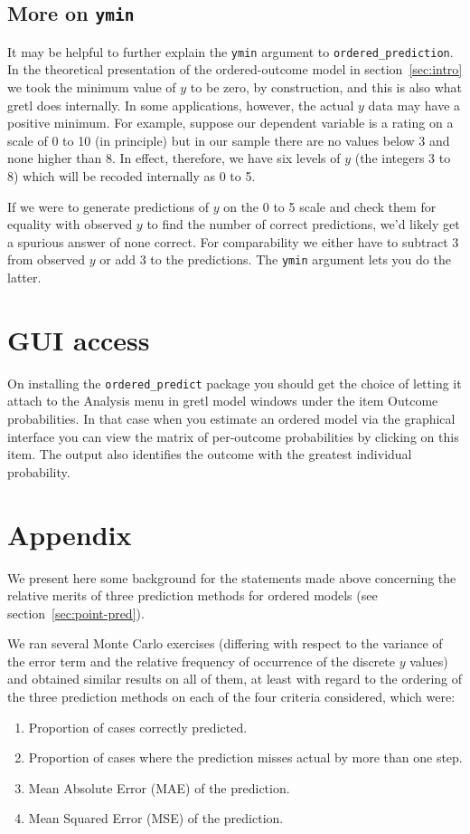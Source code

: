 \documentclass{article}
\begin{document}
\subsection{More on \texttt{ymin}}
\label{sec:ymin}

It may be helpful to further explain the \texttt{ymin} argument to
\texttt{ordered\_prediction}. In the theoretical presentation of the
ordered-outcome model in section~\ref{sec:intro} we took the minimum
value of $y$ to be zero, by construction, and this is also what gretl
does internally. In some applications, however, the actual $y$ data
may have a positive minimum. For example, suppose our dependent
variable is a rating on a scale of 0 to 10 (in principle) but in our
sample there are no values below 3 and none higher than 8. In effect,
therefore, we have six levels of $y$ (the integers 3 to 8) which will
be recoded internally as 0 to 5.

If we were to generate predictions of $y$ on the 0 to 5 scale and
check them for equality with observed $y$ to find the number of
correct predictions, we'd likely get a spurious answer of none
correct. For comparability we either have to subtract 3 from observed
$y$ or add 3 to the predictions. The \texttt{ymin} argument lets you
do the latter.

\section{GUI access}

On installing the \texttt{ordered\_predict} package you should get the
choice of letting it attach to the \textsf{Analysis} menu in gretl
model windows under the item \textsf{Outcome probabilities}. In that
case when you estimate an ordered model via the graphical interface
you can view the matrix of per-outcome probabilities by clicking on
this item. The output also identifies the outcome with the greatest
individual probability.

\clearpage

\section*{Appendix}

We present here some background for the statements made above
concerning the relative merits of three prediction methods for ordered
models (see section~\ref{sec:point-pred}).

We ran several Monte Carlo exercises (differing with respect to the
variance of the error term and the relative frequency of occurrence of
the discrete $y$ values) and obtained similar results on all of them,
at least with regard to the ordering of the three prediction methods
on each of the four criteria considered, which were:
\begin{enumerate}
\item Proportion of cases correctly predicted.
\item Proportion of cases where the prediction misses actual by more
  than one step.
\item Mean Absolute Error (MAE) of the prediction.
\item Mean Squared Error (MSE) of the prediction.
\end{enumerate}
\end{document}
